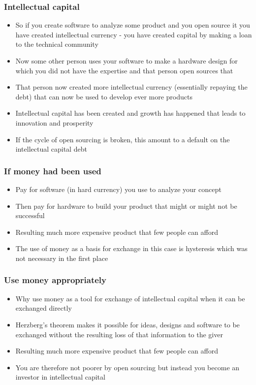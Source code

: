 \documentclass{beamer}
\begin{document}
\begin{frame}
\frametitle{Intellectual capital}

\begin{itemize}
\item So if you create software to analyze some product and you open source it you have created intellectual currency - you have created capital by making a loan to the technical community
\item Now some other person uses your software to make a hardware design for which you did not have the expertise and that person open sources that
\item That person now created more intellectual currency (essentially repaying the debt) that can now be used to develop ever more products
\item Intellectual capital has been created and growth has happened that leads to innovation and prosperity
\item If the cycle of open sourcing is broken, this amount to a default on the intellectual capital debt
\end{itemize}

\end{frame}


\begin{frame}
\frametitle{If money had been used}

\begin{itemize}
\item Pay for software (in hard currency) you use to analyze your concept 
\item Then pay for hardware to build your product that might or might not be successful  
\item Resulting much more expensive product that few people can afford
\item The use of money as a basis for exchange in this case is hysteresis which was not necessary in the first place
\end{itemize}

\end{frame}


\begin{frame}
\frametitle{Use money appropriately}

\begin{itemize}
\item Why use money as a tool for exchange of intellectual capital when it can be exchanged directly
\item Herzberg's theorem makes it possible for ideas, designs and software to be exchanged without the resulting loss of that information to the giver
\item Resulting much more expensive product that few people can afford
\item You are therefore not poorer by open sourcing but instead you become an investor in intellectual capital
\end{itemize}

\end{frame}
\end{document}
